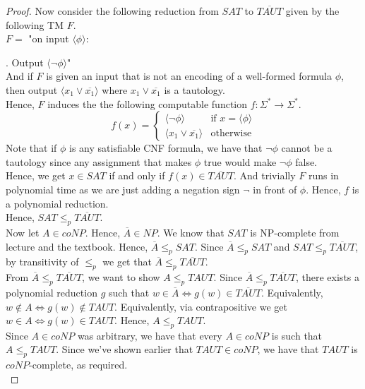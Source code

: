 \documentclass[12pt]{article}
\begin{document}
\begin{proof}
Now consider the following reduction from $SAT$ to $\overline{TAUT}$ given by the following TM $F$. \\

$F = $ "on input $\langle \phi \rangle$: \\

\setlength\parindent{15pt}

. Output $\langle \neg \phi \rangle$" \\

\setlength\parindent{0pt}
And if $F$ is given an input that is not an encoding of a well-formed formula $\phi$, then output $\langle x_1 \lor \overline{x_1} \rangle$ where $x_1 \lor \overline{x_1}$ is a tautology. \\

Hence, $F$ induces the the following computable function $f: \Sigma^* \rightarrow \Sigma^*$. \\
\[
  f(x) =
  \begin{cases}
        \langle \neg \phi \rangle & \text{if $x = \langle \phi \rangle$} \\
        \langle x_1 \lor \overline{x_1} \rangle & \text{otherwise} 
  \end{cases}
\]
Note that if $\phi$ is any satisfiable CNF formula, we have that $\neg \phi$ cannot be a tautology since any assignment that makes $\phi$ true would make $\neg \phi$ false. \\

Hence, we get $x \in SAT$ if and only if $f(x) \in \overline{TAUT}$. And trivially $F$ runs in polynomial time as we are just adding a negation sign $\neg$ in front of $\phi$. Hence, $f$ is a polynomial reduction. \\

Hence, $SAT \leq_p \overline{TAUT}$. \\

Now let $A \in coNP$. Hence, $\overline{A} \in NP$. We know that $SAT$ is NP-complete from lecture and the textbook. Hence, $\overline{A} \leq_p SAT$. Since $\overline{A} \leq_p SAT$ and $SAT \leq_p \overline{TAUT}$, by transitivity of $\leq_p$ we get that $\overline{A} \leq_p \overline{TAUT}$. \\

From $\overline{A} \leq_p \overline{TAUT}$, we want to show $A \leq_p TAUT$. Since $\overline{A} \leq_p \overline{TAUT}$, there exists a polynomial reduction $g$ such that $w \in \overline{A} \Leftrightarrow g(w) \in \overline{TAUT}$. Equivalently, $w \not \in A \Leftrightarrow g(w) \not \in TAUT$. Equivalently, via contrapositive we get $w \in A \Leftrightarrow g(w) \in TAUT$. Hence, $A \leq_p TAUT$. \\

Since $A \in coNP$ was arbitrary, we have that every $A \in coNP$ is such that $A \leq_p TAUT$. Since we've shown earlier that $TAUT \in coNP$, we have that $TAUT$ is $coNP$-complete, as required. \\

\end{proof}
\end{document}
